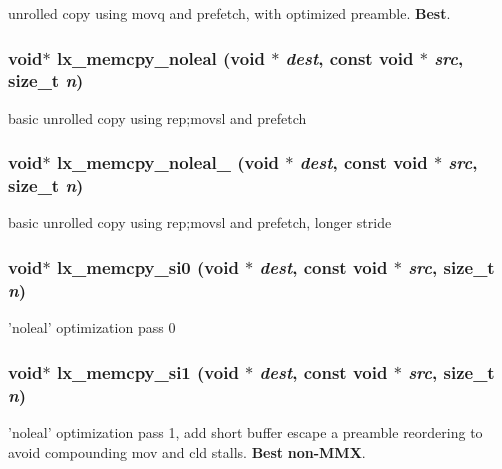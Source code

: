 unrolled copy using movq and prefetch, with optimized preamble. {\bf Best}. 
\subsubsection{\setlength{\rightskip}{0pt plus 5cm}void$\ast$ lx\_\-memcpy\_\-noleal (void $\ast$ {\em dest}, const void $\ast$ {\em src}, size\_\-t {\em n})}\label{memcpy_2def__test_8h_a8}


basic unrolled copy using rep;movsl and prefetch 
\subsubsection{\setlength{\rightskip}{0pt plus 5cm}void$\ast$ lx\_\-memcpy\_\-noleal\_ (void $\ast$ {\em dest}, const void $\ast$ {\em src}, size\_\-t {\em n})}\label{memcpy_2def__test_8h_a9}


basic unrolled copy using rep;movsl and prefetch, longer stride 
\subsubsection{\setlength{\rightskip}{0pt plus 5cm}void$\ast$ lx\_\-memcpy\_\-si0 (void $\ast$ {\em dest}, const void $\ast$ {\em src}, size\_\-t {\em n})}\label{memcpy_2def__test_8h_a10}


'noleal' optimization pass 0 
\subsubsection{\setlength{\rightskip}{0pt plus 5cm}void$\ast$ lx\_\-memcpy\_\-si1 (void $\ast$ {\em dest}, const void $\ast$ {\em src}, size\_\-t {\em n})}\label{memcpy_2def__test_8h_a11}


'noleal' optimization pass 1, add short buffer escape a preamble reordering to avoid compounding mov and cld stalls. {\bf Best} {\bf non-MMX}. 

